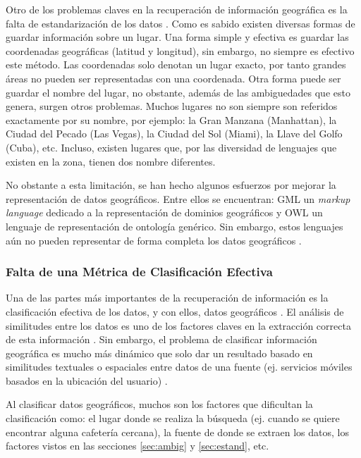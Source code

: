 \documentclass{llncs}
\begin{document}
Otro de los problemas claves en la recuperación de información geográfica es la
falta de estandarización de los datos \cite{deAndrade2014}. Como es sabido
existen diversas formas de guardar información sobre un lugar. Una forma simple
y efectiva es guardar las coordenadas geográficas (latitud y longitud), sin
embargo, no siempre es efectivo este método. Las coordenadas solo denotan un
lugar exacto, por tanto grandes áreas no pueden ser representadas con una
coordenada. Otra forma puede ser guardar el nombre del lugar, no obstante,
además de las ambiguedades que esto genera, surgen otros problemas. Muchos
lugares no son siempre son referidos exactamente por su nombre, por ejemplo: la
Gran Manzana (Manhattan), la Ciudad del Pecado (Las Vegas), la Ciudad del Sol
(Miami), la Llave del Golfo (Cuba), etc. Incluso, existen lugares que, por las
diversidad de lenguajes que existen en la zona, tienen dos nombre diferentes.

No obstante a esta limitación, se han hecho algunos esfuerzos por mejorar la
representación de datos geográficos. Entre ellos se encuentran: GML un
\emph{markup language} dedicado a la representación de dominios geográficos y
OWL un lenguaje de representación de ontología genérico. Sin embargo, estos
lenguajes aún no pueden representar de forma completa los datos geográficos
\cite{abdelmoty2005}.

\subsubsection{Falta de una Métrica de Clasificación Efectiva}\label{sec:metric}

Una de las partes más importantes de la recuperación de información es la
clasificación efectiva de los datos, y con ellos, datos geográficos
\cite{purves2004,mandl2008,cai2011}. El análisis de similitudes entre los datos
es uno de los factores claves en la extracción correcta de esta información
\cite{janowicz2011}. Sin embargo, el problema de clasificar información
geográfica es mucho más dinámico que solo dar un resultado basado en
similitudes textuales o espaciales entre datos de una fuente (ej. servicios
móviles basados en la ubicación del usuario) \cite{kumar2011}.

Al clasificar datos geográficos, muchos son los factores que dificultan la
clasificación como: el lugar donde se realiza la búsqueda (ej. cuando se quiere
encontrar alguna cafetería cercana), la fuente de donde se extraen los datos,
los factores vistos en las secciones \ref{sec:ambig} y \ref{sec:estand}, etc.
\end{document}
